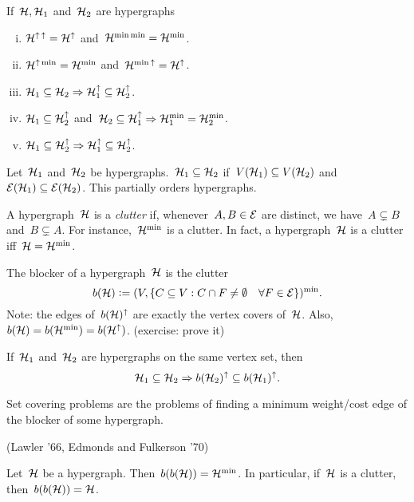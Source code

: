 \documentclass[main.tex]{subfiles}
\begin{document}
\begin{exercise}
	If~$\mathcal{H}, \mathcal{H}_1$ and~$\mathcal{H}_2$ are hypergraphs
	\begin{enumerate}[(i)]
		\item $\mathcal{H}^{\uparrow\,\uparrow} = \mathcal{H}^\uparrow$ and~$\mathcal{H}^{{\min}\,{\min}} = \mathcal{H}^{\min}$.
		\item $\mathcal{H}^{\uparrow\,\min} = \mathcal{H}^{\min}$ and~$\mathcal{H}^{{\min}\,\uparrow} = \mathcal{H}^\uparrow$.
		\item $\mathcal{H}_1 \subseteq \mathcal{H}_2 \Rightarrow \mathcal{H}_1^\uparrow \subseteq \mathcal{H}_2^\uparrow$.
		\item $\mathcal{H}_1 \subseteq \mathcal{H}_2^\uparrow$ and~$\mathcal{H}_2 \subseteq \mathcal{H}_1^\uparrow \Rightarrow \mathcal{H}_1^{\min} = \mathcal{H}_2^{\min}$.
		\item $\mathcal{H}_1 \subseteq \mathcal{H}_2^\uparrow \Rightarrow \mathcal{H}_1^\uparrow \subseteq \mathcal{H}_2^\uparrow$.
	\end{enumerate}
\end{exercise}

Let~$\mathcal{H}_1$ and~$\mathcal{H}_2$ be hypergraphs.~$\mathcal{H}_1 \subseteq \mathcal{H}_2$ if~$V(\mathcal{H}_1) \subseteq V(\mathcal{H}_2)$ and~$\mathcal{E}(\mathcal{H}_1) \subseteq \mathcal{E}(\mathcal{H}_2)$. This partially orders hypergraphs.

A hypergraph~$\mathcal{H}$ is a \emph{clutter} if, whenever~$A, B \in \mathcal{E}$ are distinct, we have~$A \subsetneq B$ and~$B \subsetneq A$. For instance,~$\mathcal{H}^{\min}$ is a clutter. In fact, a hypergraph~$\mathcal{H}$ is a clutter iff~$\mathcal{H} = \mathcal{H}^{\min}$.

The blocker of a hypergraph~$\mathcal{H}$ is the clutter
$$ b(\mathcal{H}) \vcentcolon= (V, \{C \subseteq V : C \cap F \neq \emptyset \quad \forall F \in \mathcal{E}\})^{\min}. $$
Note: the edges of~$b(\mathcal{H})^\uparrow$ are exactly the vertex covers of~$\mathcal{H}$. Also,~$b(\mathcal{H}) = b(\mathcal{H}^{\min}) = b(\mathcal{H}^\uparrow)$. (exercise: prove it)

\begin{exercise}
	If~$\mathcal{H}_1$ and~$\mathcal{H}_2$ are hypergraphs on the same vertex set, then~$$\mathcal{H}_1 \subseteq \mathcal{H}_2 \Rightarrow b(\mathcal{H}_2)^\uparrow \subseteq b(\mathcal{H}_1)^\uparrow. $$
\end{exercise}

Set covering problems are the problems of finding a minimum weight/cost edge of the blocker of some hypergraph.

\begin{theorem}
	(Lawler '66, Edmonds and Fulkerson '70)

	Let~$\mathcal{H}$ be a hypergraph. Then~$b(b(\mathcal{H})) = \mathcal{H}^{\min}$. In particular, if~$\mathcal{H}$ is a clutter, then~$b(b(\mathcal{H})) = \mathcal{H}$.
\end{theorem}
\end{document}
